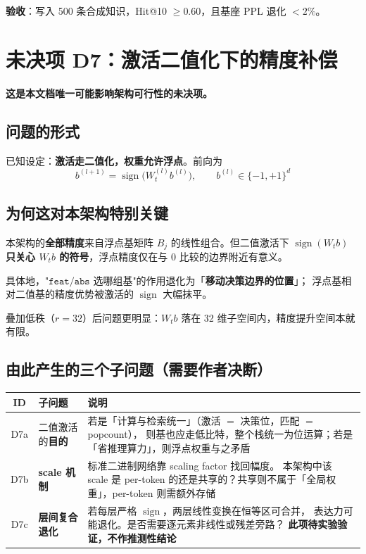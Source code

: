 \documentclass[11pt,a4paper]{ctexart}
\newcommand{\warn}[1]{\textcolor{warnred}{\textbf{#1}}}
\theoremstyle{definition}
\begin{document}
\textbf{验收}：写入 500 条合成知识，Hit@10 $\ge 0.60$，且基座 PPL 退化 $<2\%$。

\section{未决项 D7：激活二值化下的精度补偿}\label{sec:d7}

\warn{这是本文档唯一可能影响架构可行性的未决项。}

\subsection{问题的形式}

已知设定：\textbf{激活走二值化，权重允许浮点}。前向为
\begin{equation}
b^{(l+1)}=\operatorname{sign}\bigl(W_t^{(l)} b^{(l)}\bigr),\qquad b^{(l)}\in\{-1,+1\}^{d}
\end{equation}

\subsection{为何这对本架构特别关键}

本架构的\textbf{全部精度}来自浮点基矩阵 $B_j$ 的线性组合。但二值激活下
$\operatorname{sign}(W_t b)$ \textbf{只关心 $W_t b$ 的符号}，浮点精度仅在与 $0$ 比较的边界附近有意义。

具体地，"$\texttt{feat}/\texttt{abs}$ 选哪组基"的作用退化为「\textbf{移动决策边界的位置}」；
浮点基相对二值基的精度优势被激活的 $\operatorname{sign}$ 大幅抹平。

叠加低秩（$r=32$）后问题更明显：$W_t b$ 落在 32 维子空间内，精度提升空间本就有限。

\subsection{由此产生的三个子问题（需要作者决断）}

\begin{center}
\begin{tabularx}{\textwidth}{@{}clX@{}}
\toprule
\textbf{ID} & \textbf{子问题} & \textbf{说明} \\
\midrule
D7a & 二值激活的\textbf{目的} & 若是「计算与检索统一」（激活 $=$ 决策位，匹配 $=$ popcount），
则基也应走低比特，整个栈统一为位运算；若是「省推理算力」，则浮点权重与之矛盾 \\
D7b & \textbf{scale 机制} & 标准二进制网络靠 scaling factor 找回幅度。
本架构中该 scale 是 per-token 的还是共享的？共享则不属于「全局权重」，per-token 则需额外存储 \\
D7c & \textbf{层间复合退化} & 若每层严格 $\operatorname{sign}$，两层线性变换在恒等区可合并，
表达力可能退化。是否需要逐元素非线性或残差旁路？
\warn{此项待实验验证，不作推测性结论} \\
\bottomrule
\end{tabularx}
\end{center}
\end{document}
